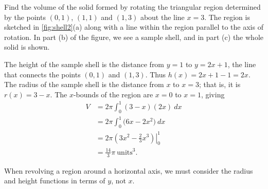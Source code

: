 \begin{example}\label{ex_shell2}
Find the volume of the solid formed by rotating the triangular region determined by the points $(0,1)$, $(1,1)$ and $(1,3)$ about the line $x=3$.
\solution
The region is sketched in \autoref{fig:shell2}(a) along with a line within the region parallel to the axis of rotation. In part (b) of the figure, we see a sample shell, and in part (c) the whole solid is shown.

The height of the sample shell is the distance from $y=1$ to $y=2x+1$, the line that connects the points $(0,1)$ and $(1,3)$. Thus $h(x) = 2x+1-1 = 2x$. The radius of the sample shell is the distance from $x$ to $x=3$; that is, it is $r(x)=3-x$. The $x$-bounds of the region are $x=0$ to $x=1$, giving
\begin{align*}
	V
	&= 2\pi\int_0^1 (3-x)(2x)\ dx \\
	&= 2\pi\int_0^1 \big(6x-2x^2)\ dx \\
	&= 2\pi\left.\left(3x^2-\frac23x^3\right)\right|_0^1\\
	&= \frac{14}{3}\pi%
	\ \text{units}^3.
\end{align*}
\end{example}

When revolving a region around a horizontal axis, we must consider the radius and height functions in terms of $y$, not $x$.

